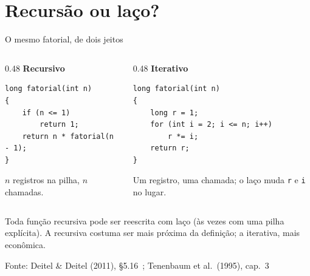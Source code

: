 \documentclass[aspectratio=169]{beamer}
\newcommand{\fonte}[1]{\vfill\hfill{\scriptsize\textcolor{UFSGray}{Fonte: #1}}}
\begin{document}
\section{Recursão ou laço?}

\begin{frame}[fragile]{O mesmo fatorial, de dois jeitos}
  \begin{columns}[T]
    \begin{column}{0.48\textwidth}
      \textcolor{UFSBlue}{\textbf{Recursivo}}
\begin{lstlisting}[style=tinyC]
long fatorial(int n)
{
    if (n <= 1)
        return 1;
    return n * fatorial(n - 1);
}
\end{lstlisting}
      \scriptsize $n$ registros na pilha, $n$ chamadas.
    \end{column}
    \begin{column}{0.48\textwidth}
      \textcolor{UFSBlue}{\textbf{Iterativo}}
\begin{lstlisting}[style=tinyC]
long fatorial(int n)
{
    long r = 1;
    for (int i = 2; i <= n; i++)
        r *= i;
    return r;
}
\end{lstlisting}
      \scriptsize Um registro, uma chamada; o laço muda \texttt{r} e
      \texttt{i} no lugar.
    \end{column}
  \end{columns}
  \begin{block}{}
    \small Toda função recursiva pode ser reescrita com laço (às vezes com
    uma pilha explícita). A recursiva costuma ser mais próxima da
    definição; a iterativa, mais econômica.
  \end{block}
  \fonte{Deitel \& Deitel (2011), §5.16~\cite{deitel2011como};
    Tenenbaum et al.\ (1995), cap.~3~\cite{tenenbaum1995estruturas}}
\end{frame}
\end{document}
